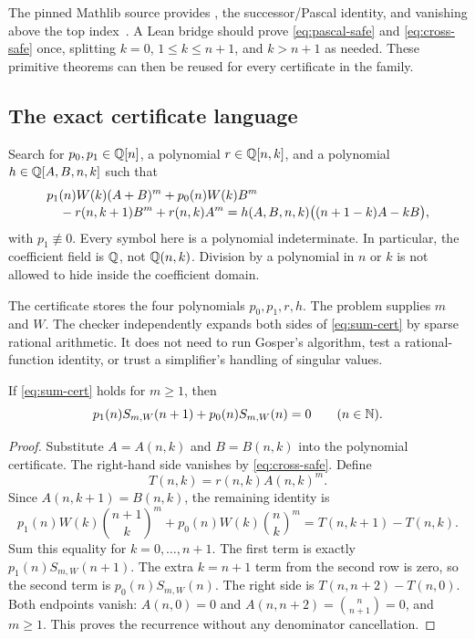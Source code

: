 The pinned Mathlib source provides , the successor/Pascal
identity, and vanishing above the top index~\cite{mathlib-choose}. A Lean bridge
should prove \eqref{eq:pascal-safe} and \eqref{eq:cross-safe} once, splitting
$k=0$, $1\le k\le n+1$, and $k>n+1$ as needed. These primitive theorems can then
be reused for every certificate in the family.

\subsection{The exact certificate language}

Search for $p_0,p_1\in\mathbb Q[n]$, a polynomial $r\in\mathbb Q[n,k]$, and a polynomial
$h\in\mathbb Q[A,B,n,k]$ such that
\begin{align}
 &p_1(n)W(k)(A+B)^m+p_0(n)W(k)B^m \notag\\[-1mm]
 &\quad-r(n,k+1)B^m+r(n,k)A^m
 =h(A,B,n,k)\big((n+1-k)A-kB\big),\label{eq:sum-cert}
\end{align}
with $p_1\not\equiv0$. Every symbol here is a polynomial indeterminate. In
particular, the coefficient field is $\mathbb Q$, not $\mathbb Q(n,k)$. Division by a
polynomial in $n$ or $k$ is not allowed to hide inside the coefficient domain.

The certificate stores the four polynomials $p_0,p_1,r,h$. The problem supplies
$m$ and $W$. The checker independently expands both sides of
\eqref{eq:sum-cert} by sparse rational arithmetic. It does not need to run
Gosper's algorithm, test a rational-function identity, or trust a simplifier's
handling of singular values.

\begin{theorem}\label{thm:sum}
If \eqref{eq:sum-cert} holds for $m\ge1$, then
\begin{equation}\label{eq:sum-rec}
 p_1(n)S_{m,W}(n+1)+p_0(n)S_{m,W}(n)=0
 \qquad(n\in\mathbb N).
\end{equation}
\end{theorem}
\begin{proof}
Substitute $A=A(n,k)$ and $B=B(n,k)$ into the polynomial certificate. The
right-hand side vanishes by \eqref{eq:cross-safe}. Define
\[
 T(n,k)=r(n,k)A(n,k)^m.
\]
Since $A(n,k+1)=B(n,k)$, the remaining identity is
\[
 p_1(n)W(k)\binom{n+1}k^m+
 p_0(n)W(k)\binom nk^m=T(n,k+1)-T(n,k).
\]
Sum this equality for $k=0,\ldots,n+1$. The first term is exactly
$p_1(n)S_{m,W}(n+1)$. The extra $k=n+1$ term from the second row is zero, so the
second term is $p_0(n)S_{m,W}(n)$. The right side is
$T(n,n+2)-T(n,0)$. Both endpoints vanish: $A(n,0)=0$ and
$A(n,n+2)=\binom n{n+1}=0$, and $m\ge1$. This proves the recurrence without
any denominator cancellation.
\end{proof}

